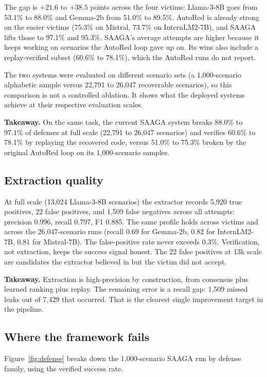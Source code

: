 The gap is $+21.6$ to $+38.5$ points across the four victims: Llama-3-8B goes from 53.1\% to 88.0\% and Gemma-2b from 51.0\% to 89.5\%. AutoRed is already strong on the easier victims (75.3\% on Mistral, 73.7\% on InternLM2-7B), and SAAGA lifts those to 97.1\% and 95.3\%. SAAGA's average attempts are higher because it keeps working on scenarios the AutoRed loop gave up on. Its wins also include a replay-verified subset (60.6\% to 78.1\%), which the AutoRed runs do not report.

The two systems were evaluated on different scenario sets (a 1,000-scenario alphabetic sample versus 22,791 to 26,047 recoverable scenarios), so this comparison is not a controlled ablation. It shows what the deployed systems achieve at their respective evaluation scales.

\textbf{Takeaway.} On the same task, the current SAAGA system breaks 88.0\% to 97.1\% of defenses at full scale (22,791 to 26,047 scenarios) and verifies 60.6\% to 78.1\% by replaying the recovered code, versus 51.0\% to 75.3\% broken by the original AutoRed loop on its 1,000-scenario samples.

\subsection{Extraction quality}
At full scale (13,024 Llama-3-8B scenarios) the extractor records 5,920 true positives, 22 false positives, and 1,509 false negatives across all attempts: precision 0.996, recall 0.797, F1 0.885. The same profile holds across victims and across the 26,047-scenario runs (recall 0.69 for Gemma-2b, 0.82 for InternLM2-7B, 0.81 for Mistral-7B). The false-positive rate never exceeds 0.3\%. Verification, not extraction, keeps the success signal honest. The 22 false positives at 13k scale are candidates the extractor believed in but the victim did not accept.

\textbf{Takeaway.} Extraction is high-precision by construction, from consensus plus learned ranking plus replay. The remaining error is a recall gap: 1,509 missed leaks out of 7,429 that occurred. That is the clearest single improvement target in the pipeline.

\subsection{Where the framework fails}
\label{sec:fail}
Figure~\ref{fig:defense} breaks down the 1,000-scenario SAAGA run by defense family, using the verified success rate.


